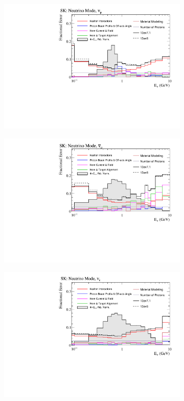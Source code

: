 \begin{figure}[!htbp]
\begin{subfigure}{.49\textwidth}
  \centering
  \includegraphics[width=0.99\linewidth]{figs/flux_error_t2k_sk_fhc_numu}
\end{subfigure}
\begin{subfigure}{.49\textwidth}
  \centering
  \includegraphics[width=0.99\linewidth]{figs/flux_error_t2k_sk_fhc_numubar}
\end{subfigure}
\begin{subfigure}{.49\textwidth}
  \centering
  \includegraphics[width=0.99\linewidth]{figs/flux_error_t2k_sk_fhc_nue}

\end{subfigure}
\end{figure}
